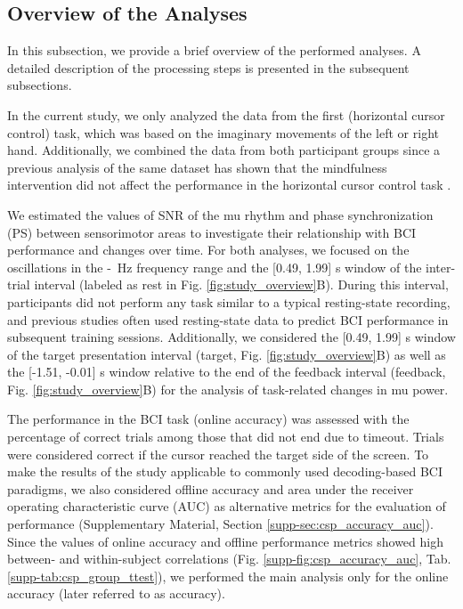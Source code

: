 \subsection{Overview of the Analyses}

In this subsection, we provide a brief overview of the performed analyses. A detailed description of the processing steps is presented in the subsequent subsections.

\medskip

In the current study, we only analyzed the data from the first (horizontal cursor control) task, which was based on the imaginary movements of the left or right hand. Additionally, we combined the data from both participant groups since a previous analysis of the same dataset has shown that the mindfulness intervention did not affect the performance in the horizontal cursor control task \citep{Stieger2020_analysis}. 

\medskip

We estimated the values of SNR of the mu rhythm and phase synchronization (PS) between sensorimotor areas to investigate their relationship with BCI performance and changes over time. For both analyses, we focused on the oscillations in the \muLow-\muHigh~Hz frequency range and the [0.49, 1.99] s window of the inter-trial interval (labeled as rest in Fig. \ref{fig:study_overview}B). During this interval, participants did not perform any task similar to a typical resting-state recording, and previous studies often used resting-state data to predict BCI performance in subsequent training sessions. Additionally, we considered the [0.49, 1.99] s window of the target presentation interval (target, Fig. \ref{fig:study_overview}B) as well as the [-1.51, -0.01] s window relative to the end of the feedback interval (feedback, Fig. \ref{fig:study_overview}B) for the analysis of task-related changes in mu power.

\medskip

The performance in the BCI task (online accuracy) was assessed with the percentage of correct trials among those that did not end due to timeout. Trials were considered correct if the cursor reached the target side of the screen. To make the results of the study applicable to commonly used decoding-based BCI paradigms, we also considered offline accuracy and area under the receiver operating characteristic curve (AUC) as alternative metrics for the evaluation of performance (Supplementary Material, Section \ref{supp-sec:csp_accuracy_auc}). Since the values of online accuracy and offline performance metrics showed high between- and within-subject correlations (Fig. \ref{supp-fig:csp_accuracy_auc}, Tab. \ref{supp-tab:csp_group_ttest}), we performed the main analysis only for the online accuracy (later referred to as accuracy).

